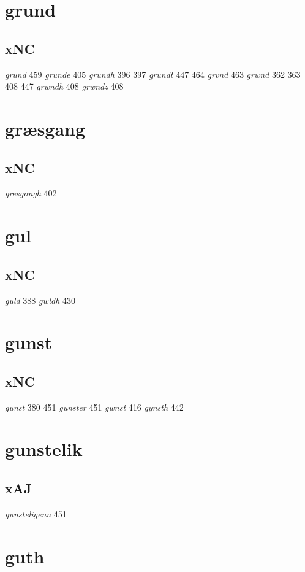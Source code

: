 \documentclass[a4paper,twocolumn]{article}
\begin{document}
\section{grund}
\label{sec:org73042b3}
\subsection{xNC}
\label{sec:orgc7afdbe}
\emph{grund} 459 \emph{grunde} 405 \emph{grundh} 396 397 \emph{grundt} 447 464 \emph{grvnd} 463 \emph{grwnd} 362 363 408 447 \emph{grwndh} 408 \emph{grwndz} 408 
\section{græsgang}
\label{sec:orgb93fb60}
\subsection{xNC}
\label{sec:org99ab215}
\emph{gresgongh} 402 
\section{gul}
\label{sec:org11c61f8}
\subsection{xNC}
\label{sec:orgf962712}
\emph{guld} 388 \emph{gwldh} 430 
\section{gunst}
\label{sec:org25c5b6a}
\subsection{xNC}
\label{sec:org4e86a67}
\emph{gunst} 380 451 \emph{gunster} 451 \emph{gwnst} 416 \emph{gynsth} 442 
\section{gunstelik}
\label{sec:orgc41d12c}
\subsection{xAJ}
\label{sec:org0e040ca}
\emph{gunsteligenn} 451 
\section{guth}
\label{sec:orgfbe60f4}
\end{document}
